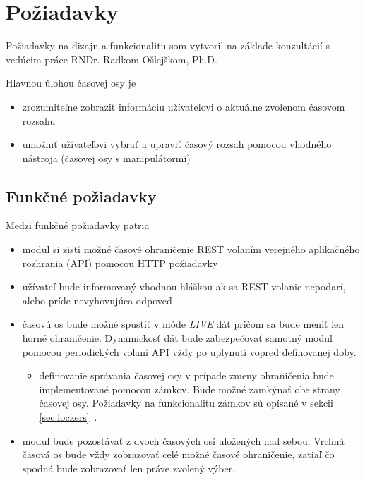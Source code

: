 \documentclass[
  digital, %
  twoside, %
  notable,   %
  nolof,   %
  nolot,   %
]{fithesis3}
\begin{document}
\section{Požiadavky}
\label{requirements}
Požiadavky na dizajn a funkcionalitu som vytvoril na základe konzultácií s vedúcim práce RNDr. Radkom Ošlejškom, Ph.D.

Hlavnou úlohou časovej osy je
\begin{itemize}
\item zrozumiteľne zobraziť informáciu užívateľovi o aktuálne zvolenom časovom rozsahu
\item umožniť užívateľovi vybrať a upraviť časový rozsah pomocou vhodného nástroja (časovej osy s manipulátormi)
\end{itemize}

\subsection{Funkčné požiadavky}
Medzi funkčné požiadavky patria
\begin{itemize}
\item modul si zistí možné časové ohraničenie REST volaním verejného aplikačného rozhrania (API) pomocou HTTP požiadavky
\item užívateľ bude informovaný vhodnou hláškou ak sa REST volanie nepodarí, alebo príde nevyhovujúca odpoveď
\item časovú os bude možné spustiť v móde \textit{LIVE} dát pričom sa bude meniť len horné ohraničenie. Dynamickosť dát bude zabezpečovať samotný modul pomocou periodických volaní API vždy po uplynutí vopred definovanej doby.
\begin{itemize}
\item definovanie správania časovej osy v prípade zmeny ohraničenia bude implementované pomocou zámkov. Bude možné zamkýnať obe strany časovej osy. Požiadavky na funkcionalitu zámkov sú opísané v sekcii \ref{sec:lockers}~.
\end{itemize}
\item modul bude pozostávať z dvoch časových osí uložených nad sebou. Vrchná časová os bude vždy zobrazovať celé možné časové ohraničenie, zatiaľ čo spodná bude zobrazovať len práve zvolený výber.
\end{itemize}
\end{document}
